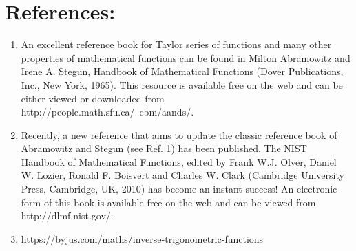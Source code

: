 \documentclass{article}
\begin{document}
    \section{References:}
    \begin{enumerate}
        \item An excellent reference book for Taylor series of functions and many other
        properties of mathematical functions can be found in Milton Abramowitz and
        Irene A. Stegun, Handbook of Mathematical Functions (Dover Publications, Inc.,
        New York, 1965). This resource is available free on the web and can be either
        viewed or downloaded from \\http://people.math.sfu.ca/~cbm/aands/.
        \item Recently, a new reference that aims to update the classic reference book of
        Abramowitz and Stegun (see Ref. 1) has been published. The NIST Handbook of
        Mathematical Functions, edited by Frank W.J. Olver, Daniel W. Lozier, Ronald
        F. Boisvert and Charles W. Clark (Cambridge University Press, Cambridge, UK,
        2010) has become an instant success! An electronic form of this book is available
        free on the web and can be viewed from http://dlmf.nist.gov/.
        \item https://byjus.com/maths/inverse-trigonometric-functions
    \end{enumerate}
\end{document}

